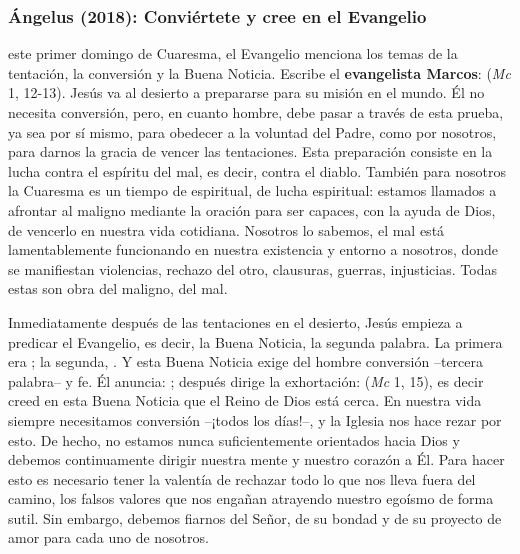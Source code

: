 \subsubsection{Ángelus (2018): Conviértete y cree en el Evangelio}


\begin{body}
 este primer domingo de Cuaresma, el Evangelio menciona los temas de la tentación, la conversión y la Buena Noticia. Escribe el \textbf{evangelista Marcos}:  (\textit{Mc} 1, 12-13). Jesús va al desierto a prepararse para su misión en el mundo. Él no necesita conversión, pero, en cuanto hombre, debe pasar a través de esta prueba, ya sea por sí mismo, para obedecer a la voluntad del Padre, como por nosotros, para darnos la gracia de vencer las tentaciones. Esta preparación consiste en la lucha contra el espíritu del mal, es decir, contra el diablo. También para nosotros la Cuaresma es un tiempo de  espiritual, de lucha espiritual: estamos llamados a afrontar al maligno mediante la oración para ser capaces, con la ayuda de Dios, de vencerlo en nuestra vida cotidiana. Nosotros lo sabemos, el mal está lamentablemente funcionando en nuestra existencia y entorno a nosotros, donde se manifiestan violencias, rechazo del otro, clausuras, guerras, injusticias. Todas estas son obra del maligno, del mal.

Inmediatamente después de las tentaciones en el desierto, Jesús empieza a predicar el Evangelio, es decir, la Buena Noticia, la segunda palabra. La primera era ; la segunda, . Y esta Buena Noticia exige del hombre conversión –tercera palabra– y fe. Él anuncia: ; después dirige la exhortación:  (\textit{Mc} 1, 15), es decir creed en esta Buena Noticia que el Reino de Dios está cerca. En nuestra vida siempre necesitamos conversión –¡todos los días!–, y la Iglesia nos hace rezar por esto. De hecho, no estamos nunca suficientemente orientados hacia Dios y debemos continuamente dirigir nuestra mente y nuestro corazón a Él. Para hacer esto es necesario tener la valentía de rechazar todo lo que nos lleva fuera del camino, los falsos valores que nos engañan atrayendo nuestro egoísmo de forma sutil. Sin embargo, debemos fiarnos del Señor, de su bondad y de su proyecto de amor para cada uno de nosotros.


\end{body}

